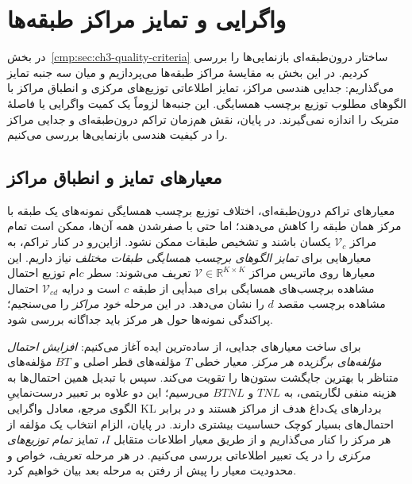 \section{واگرایی و تمایز مراکز طبقه‌ها}
\label{cmp:sec:ch3-center-separation}

در بخش~\ref{cmp:sec:ch3-quality-criteria} ساختار
درون‌طبقه‌ای بازنمایی‌ها را بررسی کردیم. در این بخش
به مقایسهٔ مراکز طبقه‌ها می‌پردازیم و میان سه جنبه
تمایز می‌گذاریم: جدایی هندسی مراکز، تمایز اطلاعاتی
توزیع‌های مرکزی و انطباق مراکز با الگوهای مطلوب
توزیع برچسب همسایگی. این جنبه‌ها لزوماً یک کمیت
واگرایی یا فاصلهٔ متریک را اندازه نمی‌گیرند.
در پایان، نقش هم‌زمان تراکم درون‌طبقه‌ای و جدایی
مراکز را در کیفیت هندسی بازنمایی‌ها بررسی می‌کنیم.

\subsection{معیارهای تمایز و انطباق مراکز}
\label{cmp:subsec:ch3-center-separation-criteria}
معیارهای تراکم درون‌طبقه‌ای، اختلاف توزیع برچسب همسایگی
نمونه‌های یک طبقه با مرکز همان طبقه را کاهش می‌دهند؛
اما حتی با صفرشدن همه آن‌ها، ممکن است تمام مراکز
$\mathcal V_c$ یکسان باشند و تشخیص طبقات ممکن نشود.
ازاین‌رو در کنار تراکم، به معیارهایی برای
\emph{تمایز الگوهای برچسب همسایگی طبقات مختلف}
نیاز داریم. این معیارها روی ماتریس مراکز
$\mathcal V\in\mathbb R^{K\times K}$ تعریف می‌شوند:
سطر $c$ام توزیع احتمال مشاهده برچسب‌های همسایگی
برای مبدأیی از طبقه $c$ است و درایه
$\mathcal V_{cd}$ احتمال مشاهده برچسب مقصد $d$
را نشان می‌دهد. در این مرحله \emph{خود مراکز}
را می‌سنجیم؛ پراکندگی نمونه‌ها حول هر مرکز
باید جداگانه بررسی شود.

برای ساخت معیارهای جدایی، از ساده‌ترین
ایده آغاز می‌کنیم: \emph{افزایش احتمال
مؤلفه‌های برگزیده هر مرکز}.
معیار خطی $T$ مؤلفه‌های قطر اصلی و
$BT$ مؤلفه‌های متناظر با بهترین
جایگشت ستون‌ها را تقویت می‌کند.
سپس با تبدیل همین احتمال‌ها به
هزینه منفی لگاریتمی، به $TNL$ و $BTNL$
می‌رسیم؛ این دو علاوه بر تعبیر
درست‌نماییِ الگوی مرجع، معادل
واگرایی KL بردارهای یک‌داغ هدف
از مراکز هستند و در برابر
احتمال‌های بسیار کوچک حساسیت بیشتری دارند.
در پایان، الزام انتخاب یک مؤلفه
از هر مرکز را کنار می‌گذاریم
و از طریق معیار اطلاعات متقابل $I$،
تمایز \emph{تمام توزیع‌های مرکزی}
را در یک تعبیر اطلاعاتی بررسی می‌کنیم.
در هر مرحله تعریف، خواص و محدودیت معیار
را پیش از رفتن به مرحله بعد بیان خواهیم کرد.

